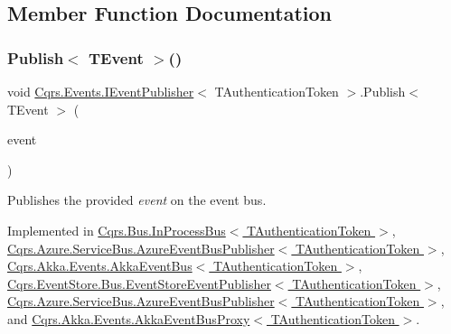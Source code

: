 \subsection{Member Function Documentation}
\mbox{\label{interfaceCqrs_1_1Events_1_1IEventPublisher_a02f0db0bc9b3aa1c7f766f58f8422ee3_a02f0db0bc9b3aa1c7f766f58f8422ee3}} 
\subsubsection{\texorpdfstring{Publish$<$ T\+Event $>$()}{Publish< TEvent >()}\hspace{0.1cm}{\footnotesize\ttfamily [1/2]}}
{\footnotesize\ttfamily void \hyperlink{interfaceCqrs_1_1Events_1_1IEventPublisher}{Cqrs.\+Events.\+I\+Event\+Publisher}$<$ T\+Authentication\+Token $>$.Publish$<$ T\+Event $>$ (\begin{DoxyParamCaption}\item[{T\+Event @}]{event }\end{DoxyParamCaption})}



Publishes the provided {\itshape event}  on the event bus. 



Implemented in \hyperlink{classCqrs_1_1Bus_1_1InProcessBus_afd3d41a5f27a985e9d6ccf3f6f77f11a_afd3d41a5f27a985e9d6ccf3f6f77f11a}{Cqrs.\+Bus.\+In\+Process\+Bus$<$ T\+Authentication\+Token $>$}, \hyperlink{classCqrs_1_1Azure_1_1ServiceBus_1_1AzureEventBusPublisher_a175365f8217cfe163ffadc891f0cd3e3_a175365f8217cfe163ffadc891f0cd3e3}{Cqrs.\+Azure.\+Service\+Bus.\+Azure\+Event\+Bus\+Publisher$<$ T\+Authentication\+Token $>$}, \hyperlink{classCqrs_1_1Akka_1_1Events_1_1AkkaEventBus_aaba5d37020e21d03cc2bbc3da14f45ea_aaba5d37020e21d03cc2bbc3da14f45ea}{Cqrs.\+Akka.\+Events.\+Akka\+Event\+Bus$<$ T\+Authentication\+Token $>$}, \hyperlink{classCqrs_1_1EventStore_1_1Bus_1_1EventStoreEventPublisher_a1ebb6f08648bdfd5c5bd29fcc12adfea_a1ebb6f08648bdfd5c5bd29fcc12adfea}{Cqrs.\+Event\+Store.\+Bus.\+Event\+Store\+Event\+Publisher$<$ T\+Authentication\+Token $>$}, \hyperlink{classCqrs_1_1Azure_1_1ServiceBus_1_1AzureEventBusPublisher_a175365f8217cfe163ffadc891f0cd3e3_a175365f8217cfe163ffadc891f0cd3e3}{Cqrs.\+Azure.\+Service\+Bus.\+Azure\+Event\+Bus\+Publisher$<$ T\+Authentication\+Token $>$}, and \hyperlink{classCqrs_1_1Akka_1_1Events_1_1AkkaEventBusProxy_a656daead2fe6f30487855dbaea5a3c83_a656daead2fe6f30487855dbaea5a3c83}{Cqrs.\+Akka.\+Events.\+Akka\+Event\+Bus\+Proxy$<$ T\+Authentication\+Token $>$}.

